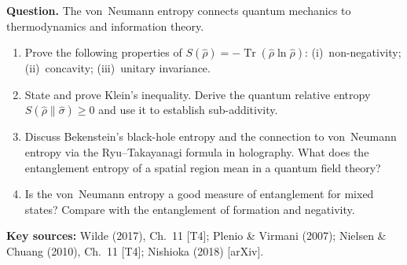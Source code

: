 \documentclass[11pt,a4paper]{article}
\begin{document}
\begin{tcolorbox}[researchbox, title={WRQ 4 --- Information-Theoretic: Entropy, Information, and the Second Law}]

\textbf{Question.}
The von~Neumann entropy connects quantum mechanics to thermodynamics and information theory.

\begin{enumerate}[leftmargin=1.8em, label=(\alph*), itemsep=6pt]
  \item Prove the following properties of $S(\hat{\rho})=-\operatorname{Tr}(\hat{\rho}\ln\hat{\rho})$:
        (i)~non-negativity; (ii)~concavity; (iii)~unitary invariance.
  \item State and prove Klein's inequality.
        Derive the quantum relative entropy $S(\hat{\rho}\|\hat{\sigma})\ge 0$
        and use it to establish sub-additivity.
  \item Discuss Bekenstein's black-hole entropy and the connection to von~Neumann
        entropy via the Ryu--Takayanagi formula in holography.
        What does the entanglement entropy of a spatial region mean
        in a quantum field theory?
  \item Is the von~Neumann entropy a good measure of entanglement for mixed states?
        Compare with the entanglement of formation and negativity.
\end{enumerate}

\medskip\textbf{Key sources:} Wilde (2017), Ch.~11 [T4]; Plenio \& Virmani (2007);
Nielsen \& Chuang (2010), Ch.~11 [T4]; Nishioka (2018) [arXiv].
\end{tcolorbox}

\bigskip
\end{document}
